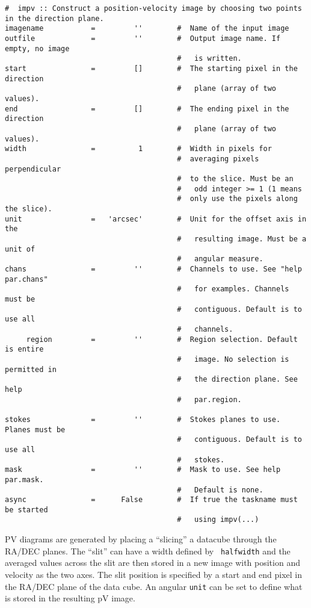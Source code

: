 \small
\begin{verbatim}
#  impv :: Construct a position-velocity image by choosing two points in the direction plane.
imagename           =         ''        #  Name of the input image
outfile             =         ''        #  Output image name. If empty, no image
                                        #   is written.
start               =         []        #  The starting pixel in the direction
                                        #   plane (array of two values).
end                 =         []        #  The ending pixel in the direction
                                        #   plane (array of two values).
width               =          1        #  Width in pixels for
                                        #  averaging pixels perpendicular 
                                        #  to the slice. Must be an
                                        #   odd integer >= 1 (1 means 
                                        #  only use the pixels along the slice).
unit                =   'arcsec'        #  Unit for the offset axis in the
                                        #   resulting image. Must be a unit of
                                        #   angular measure.
chans               =         ''        #  Channels to use. See "help par.chans"
                                        #   for examples. Channels must be
                                        #   contiguous. Default is to use all
                                        #   channels.
     region         =         ''        #  Region selection. Default is entire
                                        #   image. No selection is permitted in
                                        #   the direction plane. See help
                                        #   par.region.

stokes              =         ''        #  Stokes planes to use. Planes must be
                                        #   contiguous. Default is to use all
                                        #   stokes.
mask                =         ''        #  Mask to use. See help par.mask.
                                        #   Default is none.
async               =      False        #  If true the taskname must be started
                                        #   using impv(...)
\end{verbatim}
\normalsize

PV diagrams are generated by placing a ``slicing'' a datacube through
the RA/DEC planes. The ``slit'' can have a width defined by {\tt
  halfwidth} and the averaged values across the slit are then stored
in a new image with position and velocity as the two axes. The slit
position is specified by a start and end pixel in the RA/DEC
plane of the data cube. An angular {\tt unit} can be set to define
what is stored in the resulting pV image.



